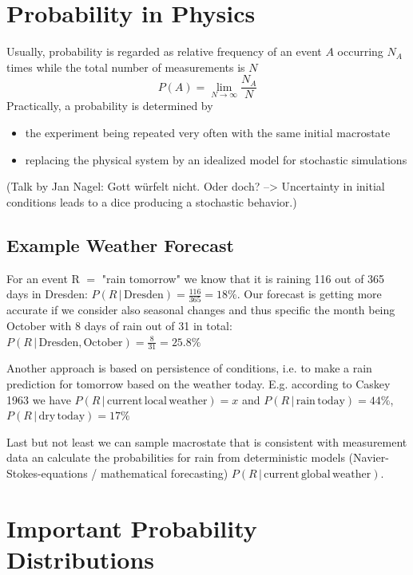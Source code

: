 \documentclass{/home/ben/Templates/notebook}
\begin{document}
	
	\section{Probability in Physics}
	
	Usually, probability is regarded as relative frequency of an event $A$ occurring $N_A$ times while the total number of measurements is $N$
	\begin{equation}
	P(A) = \lim_{N \to \infty}{\frac{N_A}{N}}
	\end{equation}
	Practically, a probability is determined by
	\begin{itemize}
		\item{the experiment being repeated very often with the same initial macrostate}
		\item{replacing the physical system by an idealized model for stochastic simulations}
	\end{itemize}
	(Talk by Jan Nagel: Gott würfelt nicht. Oder doch? --> Uncertainty in initial conditions leads to a dice producing a stochastic behavior.)
	
	\subsection*{Example Weather Forecast}
	
	For an event R $=$ "rain tomorrow" we know that it is raining 116 out of 365 days in Dresden: $P(R \, | \, \mathrm{Dresden}) = \frac{116}{365} = 18 \%$. Our forecast is getting more accurate if we consider also seasonal changes and thus specific the month being October with 8 days of rain out of 31 in total: $P(R \, | \, \mathrm{Dresden, October}) = \frac{8}{31} = 25.8 \%$
	
	Another approach is based on persistence of conditions, i.e. to make a rain prediction for tomorrow based on the weather today. E.g. according to Caskey 1963 we have $P(R \, | \, \mathrm{current \, local \, weather}) = x$ and $P(R \, | \, \mathrm{rain \, today}) = 44 \%$, $P(R \, | \, \mathrm{dry \, today}) = 17 \%$
	
	Last but not least we can sample macrostate that is consistent with measurement data an calculate the probabilities for rain from deterministic models (Navier-Stokes-equations / mathematical forecasting) $P(R \, | \, \mathrm{current \, global \, weather})$.
	
	\section{Important Probability Distributions}
	
\end{document}
